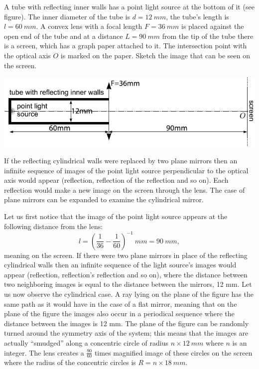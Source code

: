 A tube with reflecting inner walls has a point light source at the bottom of it (see figure). The inner diameter of the tube is $d=\SI{12}{mm}$, the tube’s length is $l=\SI{60}{mm}$. A convex lens with a focal length $F=\SI{36}{mm}$ is placed against the open end of the tube and at a distance $L=\SI{90}{mm}$ from the tip of the tube there is a screen, which has a graph paper attached to it. The intersection point with the optical axis $O$ is marked on the paper. Sketch the image that can be seen on the screen.
\begin{center}
\includegraphics[width=\textwidth]{2012-v3g-06-toru-valgusallikas-lxxts_ing}
\end{center}

\hinteng
If the reflecting cylindrical walls were replaced by two plane mirrors then an infinite sequence of images of the point light source perpendicular to the optical axis would appear (reflection, reflection of the reflection and so on). Each reflection would make a new image on the screen through the lens. The case of plane mirrors can be expanded to examine the cylindrical mirror.

\solueng
Let us first notice that the image of the point light source appears at the following distance from the lens:
$$l=\left(\frac 1{36}-\frac 1{60}\right)^{-1}\SI{}{mm}=\SI{90}{mm},$$ 
meaning on the screen. If there were two plane mirrors in place of the reflecting cylindrical walls then an infinite sequence of the light source’s images would appear (reflection, reflection’s reflection and so on), where the distance between two neighboring images is equal to the distance between the mirrors, 12 mm. Let us now observe the cylindrical case. A ray lying on the plane of the figure has the same path as it would have in the case of a flat mirror, meaning that on the plane of the figure the images also occur in a periodical sequence where the distance between the images is 12 mm. The plane of the figure can be randomly turned around the symmetry axis of the system; this means that the images are actually “smudged” along a concentric circle of radius $n\times\SI{12}{mm}$ where $n$ is an integer. The lens creates a $\frac{90}{60}$ times magnified image of these circles on the screen where the radius of the concentric circles is $R=n\times \SI{18}{mm}$.
\probend